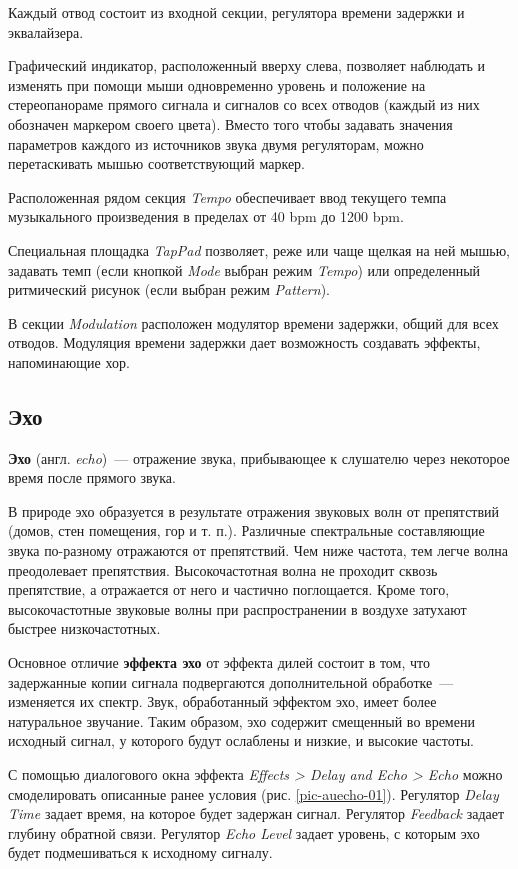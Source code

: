 \documentclass[oneside, final, 14pt]{extreport}
\begin{document}
Каждый отвод состоит из входной секции, регулятора времени задержки и эквалайзера.

Графический индикатор, расположенный вверху слева, позволяет наблюдать и изменять при помощи мыши одновременно уровень и положение на стереопанораме прямого сигнала и сигналов со всех отводов (каждый из них обозначен маркером своего цвета). Вместо того чтобы задавать значения параметров каждого из источников звука двумя регуляторам, можно перетаскивать мышью соответствующий маркер.

Расположенная рядом секция \emph{Tempo} обеспечивает ввод текущего темпа музыкального произведения в пределах от 40 bpm до 1200 bpm.

Специальная площадка \emph{TapPad} позволяет, реже или чаще щелкая на ней мышью, задавать темп (если кнопкой \emph{Mode} выбран режим \emph{Tempo}) или определенный ритмический рисунок (если выбран режим \emph{Pattern}).

В секции \emph{Modulation} расположен модулятор времени задержки, общий для всех отводов. Модуляция времени задержки дает возможность создавать эффекты, напоминающие хор.

\subsection{Эхо}
\textbf{Эхо} (англ. \emph{echo})~--- отражение звука, прибывающее к слушателю через некоторое время после прямого звука.

В природе эхо образуется в результате отражения звуковых волн от препятствий (домов, стен помещения, гор и т. п.). Различные спектральные составляющие звука по-разному отражаются от препятствий. Чем ниже частота, тем легче волна преодолевает препятствия. Высокочастотная волна не проходит сквозь препятствие, а отражается от него и частично поглощается. Кроме того, высокочастотные звуковые волны при распространении в воздухе затухают быстрее низкочастотных.

Основное отличие \textbf{эффекта эхо} от эффекта дилей состоит в том, что задержанные копии сигнала подвергаются дополнительной обработке~--- изменяется их спектр. Звук, обработанный эффектом эхо, имеет более натуральное звучание. Таким образом, эхо содержит смещенный во времени исходный сигнал, у которого будут ослаблены и низкие, и высокие частоты.

С помощью диалогового окна эффекта \emph{Effects > Delay and Echo > Echo} можно смоделировать описанные ранее условия (рис. \ref{pic-auecho-01}). Регулятор \emph{Delay Time} задает время, на которое будет задержан сигнал. Регулятор \emph{Feedback} задает глубину обратной связи. Регулятор \emph{Echo Level} задает уровень, с которым эхо будет подмешиваться к исходному сигналу.
\end{document}
